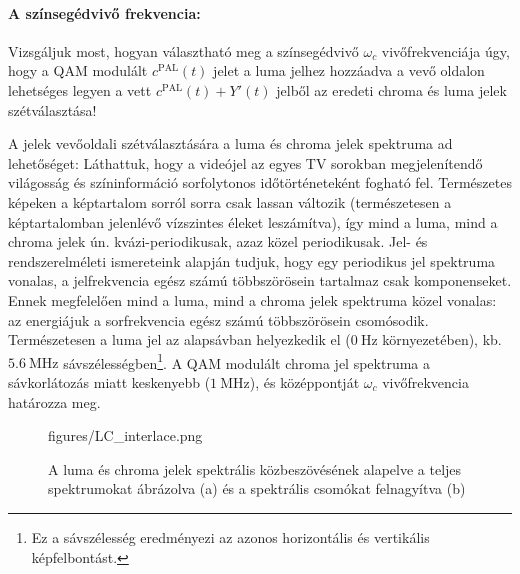 \paragraph{A színsegédvivő frekvencia:}
Vizsgáljuk most, hogyan választható meg a színsegédvivő $\omega_c$ vivőfrekvenciája úgy, hogy a QAM modulált $c^{\mathrm{PAL}}(t)$ jelet a luma jelhez hozzáadva a vevő oldalon lehetséges legyen a vett $c^{\mathrm{PAL}}(t) + Y'(t)$ jelből az eredeti chroma és luma jelek szétválasztása!

A jelek vevőoldali szétválasztására a luma és chroma jelek spektruma ad lehetőséget:
Láthattuk, hogy a videójel az egyes TV sorokban megjelenítendő világosság és színinformáció sorfolytonos időtörténeteként fogható fel.
Természetes képeken a képtartalom sorról sorra csak lassan változik (természetesen a képtartalomban jelenlévő vízszintes éleket leszámítva), így mind a luma, mind a chroma jelek ún. kvázi-periodikusak, azaz közel periodikusak.
Jel- és rendszerelméleti ismereteink alapján tudjuk, hogy egy periodikus jel spektruma vonalas, a jelfrekvencia egész számú többszörösein tartalmaz csak komponenseket.
Ennek megfelelően mind a luma, mind a chroma jelek spektruma közel vonalas: az energiájuk a sorfrekvencia egész számú többszörösein csomósodik.
Természetesen a luma jel az alapsávban helyezkedik el ($0~\mathrm{Hz}$ környezetében), kb. $5.6~\mathrm{MHz}$ sávszélességben\footnote{Ez a sávszélesség eredményezi az azonos horizontális és vertikális képfelbontást.}.
A QAM modulált chroma jel spektruma a sávkorlátozás miatt keskenyebb ($1~\mathrm{MHz}$), és középpontját $\omega_c$ vivőfrekvencia határozza meg.
\begin{figure}[]
	\centering
	\hspace{4mm}
	\begin{overpic}[width = 0.80\columnwidth ]{figures/LC_interlace.png}
	\end{overpic} \hfill
	\caption{A luma és chroma jelek spektrális közbeszövésének alapelve a teljes spektrumokat ábrázolva (a) és a spektrális csomókat felnagyítva (b)}
	\label{Fig:YC_interlace}
\end{figure}


